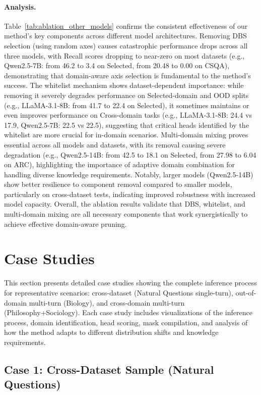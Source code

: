 \paragraph{Analysis.}
Table~\ref{tab:ablation_other_models} confirms the consistent effectiveness of our method's key components across different model architectures. Removing DBS selection (using random axes) causes catastrophic performance drops across all three models, with Recall scores dropping to near-zero on most datasets (e.g., Qwen2.5-7B: from 46.2 to 3.4 on Selected, from 20.48 to 0.00 on CSQA), demonstrating that domain-aware axis selection is fundamental to the method's success. The whitelist mechanism shows dataset-dependent importance: while removing it severely degrades performance on Selected-domain and OOD splits (e.g., LLaMA-3.1-8B: from 41.7 to 22.4 on Selected), it sometimes maintains or even improves performance on Cross-domain tasks (e.g., LLaMA-3.1-8B: 24.4 vs 17.9, Qwen2.5-7B: 22.5 vs 22.5), suggesting that critical heads identified by the whitelist are more crucial for in-domain scenarios. Multi-domain mixing proves essential across all models and datasets, with its removal causing severe degradation (e.g., Qwen2.5-14B: from 42.5 to 18.1 on Selected, from 27.98 to 6.04 on ARC), highlighting the importance of adaptive domain combination for handling diverse knowledge requirements. Notably, larger models (Qwen2.5-14B) show better resilience to component removal compared to smaller models, particularly on cross-dataset tests, indicating improved robustness with increased model capacity. Overall, the ablation results validate that DBS, whitelist, and multi-domain mixing are all necessary components that work synergistically to achieve effective domain-aware pruning.

\section{Case Studies}
\label{app:case_study}

This section presents detailed case studies showing the complete inference process for representative scenarios: cross-dataset (Natural Questions single-turn), out-of-domain multi-turn (Biology), and cross-domain multi-turn (Philosophy+Sociology).
Each case study includes visualizations of the inference process, domain identification, head scoring, mask compilation, and analysis of how the method adapts to different distribution shifts and knowledge requirements.

\subsection{Case 1: Cross-Dataset Sample (Natural Questions)}
\label{app:case_nq_single}

